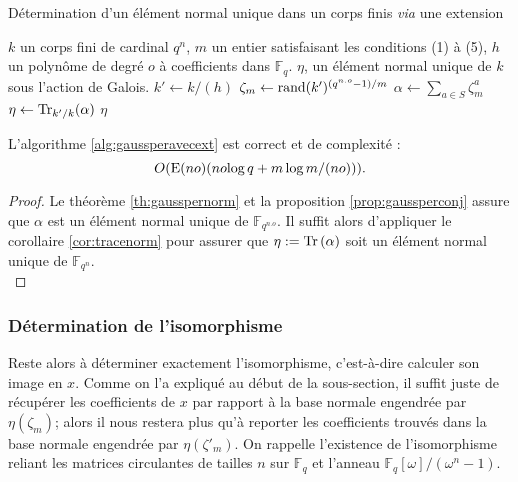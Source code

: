 \documentclass[a4paper]{article} %
\numberwithin{section}{part}
\numberwithin{equation}{section}
\newcommand\GF[1]{\mathbb{F}_{#1}}
\newcommand\Tr[1]{\textup{Tr}\left(#1\right)}
\newcommand\E[1]{\textup{E}(#1)}
\begin{document}
\begin{algorithm}
\caption{Détermination d'un élément normal unique dans un corps finis
\textit{via} une extension}
\label{alg:gaussperavecext}
\begin{algorithmic}[1]
\REQUIRE $k$ un corps fini de cardinal $q^n$, $m$ un entier satisfaisant les 
conditions (1) à (5), $h$ un polynôme de degré $o$ à coefficients dans $\GF{q}$.
\ENSURE $\eta$, un élément normal unique de $k$ sous l'action de Galois.
\bigskip
\STATE $k' \leftarrow k/(h)$
\REPEAT
    \STATE $\zeta_m \leftarrow \textup{rand}(k')^{(q^{n.o} - 1)/m}$
\STATE $\alpha \leftarrow \sum_{a\in S}{\zeta_m^a}$
\STATE $\eta \leftarrow \textup{Tr}_{k'/k}(\alpha)$
\RETURN $\eta$
\end{algorithmic}
\end{algorithm}
\begin{prop} 
\label{prop:algavecext}
L'algorithme \ref{alg:gaussperavecext} est correct et de complexité :
\begin{equation}
O(\E{no}(no\textup{log\,}q + m\,\textup{log\,}m/(no))).
\end{equation}
\end{prop}
\begin{proof}
Le théorème \ref{th:gausspernorm} et la proposition \ref{prop:gaussperconj}
assure que $\alpha$ est un élément normal unique de $\GF{q^{n.o}}$. Il suffit 
alors d'appliquer le corollaire \ref{cor:tracenorm} pour assurer que $\eta :=
\Tr{\alpha}$ soit un élément normal unique de $\GF{q^n}$.\\
\end{proof}

\subsubsection*{Détermination de l'isomorphisme}
Reste alors à déterminer exactement l'isomorphisme, c'est-à-dire calculer son
image en $x$. Comme on l'a expliqué au début de la sous-section, il suffit juste
de récupérer les coefficients de $x$ par rapport à la base normale engendrée par
$\eta(\zeta_m)$; alors il nous restera plus qu'à reporter les coefficients 
trouvés dans la base normale engendrée par $\eta(\zeta'_m)$. On rappelle
l'existence de l'isomorphisme reliant les matrices circulantes de tailles $n$ 
sur $\GF{q}$ et l'anneau $\GF{q}[\omega]/(\omega^n - 1)$.
\end{document}
